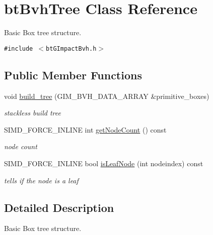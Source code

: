 \hypertarget{classbt_bvh_tree}{
\section{btBvhTree Class Reference}
\label{classbt_bvh_tree}
}
Basic Box tree structure.  


{\tt \#include $<$btGImpactBvh.h$>$}

\subsection*{Public Member Functions}
\begin{Indent}{\bf }\par
\begin{CompactItemize}
\item 
void \hyperlink{classbt_bvh_tree_ed589b2985838c6268597f4f64a96c46}{build\_\-tree} (GIM\_\-BVH\_\-DATA\_\-ARRAY \&primitive\_\-boxes)
\begin{CompactList}\small\item\em stackless build tree \item\end{CompactList}\item 
\hypertarget{classbt_bvh_tree_676b9b3a4c8ba0a2c215b20d9448d985}{
SIMD\_\-FORCE\_\-INLINE int \hyperlink{classbt_bvh_tree_676b9b3a4c8ba0a2c215b20d9448d985}{getNodeCount} () const }
\label{classbt_bvh_tree_676b9b3a4c8ba0a2c215b20d9448d985}

\begin{CompactList}\small\item\em node count \item\end{CompactList}\item 
\hypertarget{classbt_bvh_tree_f5d8776467b0f7c9e12091f813f6b2af}{
SIMD\_\-FORCE\_\-INLINE bool \hyperlink{classbt_bvh_tree_f5d8776467b0f7c9e12091f813f6b2af}{isLeafNode} (int nodeindex) const }
\label{classbt_bvh_tree_f5d8776467b0f7c9e12091f813f6b2af}

\begin{CompactList}\small\item\em tells if the node is a leaf \item\end{CompactList}\end{CompactItemize}
\end{Indent}


\subsection{Detailed Description}
Basic Box tree structure. 

